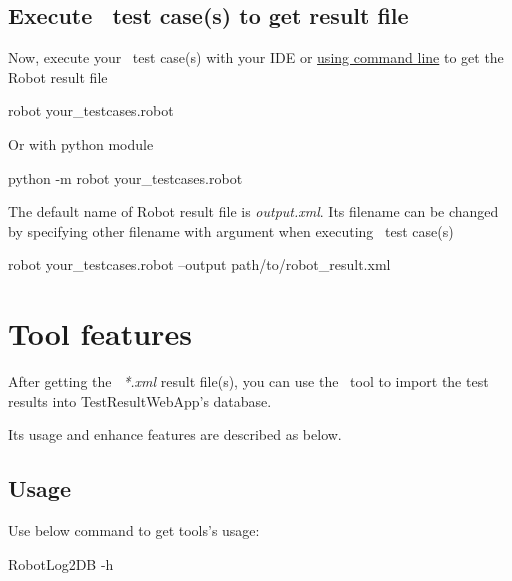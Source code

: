   \subsection{Execute \rfwcore\ test case(s) to get result file}
    Now, execute your \rfwcore\ test case(s) with your IDE or 
    \href{https://robotframework.org/robotframework/latest/RobotFrameworkUserGuide.html#starting-test-execution}
    {using command line} to get the Robot result file
\begin{robotlog}
robot your_testcases.robot
\end{robotlog}
    Or with python module
\begin{robotlog}
python -m robot your_testcases.robot
\end{robotlog}
    
    The default name of Robot result file is \emph{output.xml}. Its filename can 
    be changed by specifying other filename with argument  
    when executing \rfwcore\ test case(s)
\begin{robotlog}
robot your_testcases.robot --output path/to/robot_result.xml
\end{robotlog}

\newpage
\hypertarget{description-tool-features}{%
\section{Tool features}\label{description-tool-features}}
  After getting the \rfwcore\ \emph{*.xml} result file(s), you can use the \pkg\ 
  tool to import the test results into TestResultWebApp's database.

  Its usage and enhance features are described as below.

  \subsection{Usage}
    Use below command to get tools's usage:
\begin{robotlog}
RobotLog2DB -h
\end{robotlog}
      
